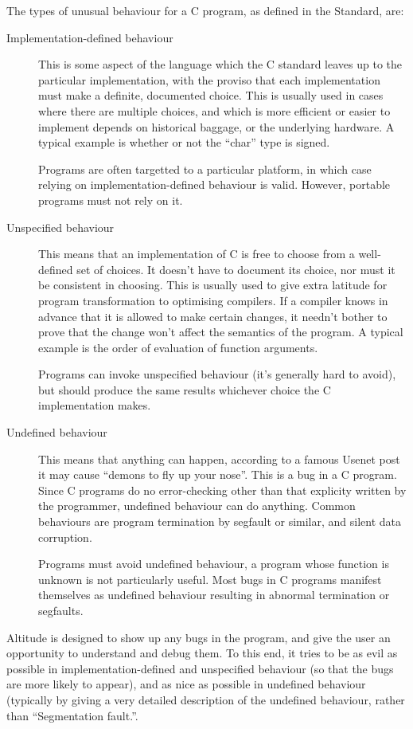 \documentclass[a4paper]{report}
\begin{document}
The types of unusual behaviour for a C program, as defined in the Standard, are:
\begin{description}
\item[Implementation-defined behaviour] This is some aspect of the language which the C standard leaves up to the particular implementation, with the proviso that each implementation must make a definite, documented choice. This is usually used in cases where there are multiple choices, and which is more efficient or easier to implement depends on historical baggage, or the underlying hardware. A typical example is whether or not the ``char'' type is signed.

Programs are often targetted to a particular platform, in which case relying on implementation-defined behaviour is valid. However, portable programs must not rely on it.

\item[Unspecified behaviour] This means that an implementation of C is free to choose from a well-defined set of choices. It doesn't have to document its choice, nor must it be consistent in choosing. This is usually used to give extra latitude for program transformation to optimising compilers. If a compiler knows in advance that it is allowed to make certain changes, it needn't bother to prove that the change won't affect the semantics of the program. A typical example is the order of evaluation of function arguments.

Programs can invoke unspecified behaviour (it's generally hard to avoid), but should produce the same results whichever choice the C implementation makes.

\item[Undefined behaviour] This means that anything can happen, according to a famous Usenet post it may cause ``demons to fly up your nose''. This is a bug in a C program. Since C programs do no error-checking other than that explicity written by the programmer, undefined behaviour can do anything. Common behaviours are program termination by segfault or similar, and silent data corruption.

Programs must avoid undefined behaviour, a program whose function is unknown is not particularly useful. Most bugs in C programs manifest themselves as undefined behaviour resulting in abnormal termination or segfaults.
\end{description}

Altitude is designed to show up any bugs in the program, and give the user an opportunity to understand and debug them. To this end, it tries to be as evil as possible in implementation-defined and unspecified behaviour (so that the bugs are more likely to appear), and as nice as possible in undefined behaviour (typically by giving a very detailed description of the undefined behaviour, rather than ``Segmentation fault.''.
\end{document}
